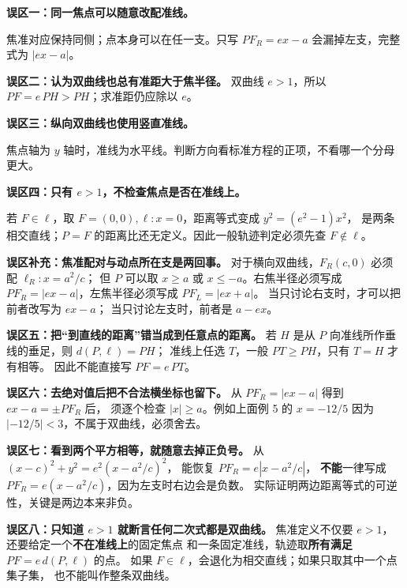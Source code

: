 \begin{trapbox}
\textbf{误区一：同一焦点可以随意改配准线。}

焦准对应保持同侧；点本身可以在任一支。只写 $PF_R=ex-a$ 会漏掉左支，完整式为 $|ex-a|$。

\textbf{误区二：认为双曲线也总有准距大于焦半径。}
双曲线 $e>1$，所以 $PF=e\,PH>PH$；求准距仍应除以 $e$。
\end{trapbox}
\clearpage
\begin{trapbox}
\textbf{误区三：纵向双曲线也使用竖直准线。}

焦点轴为 $y$ 轴时，准线为水平线。判断方向看标准方程的正项，不看哪一个分母更大。
\end{trapbox}
\clearpage
\begin{trapbox}
\textbf{误区四：只有 $e>1$，不检查焦点是否在准线上。}

若 $F\in\ell$，取 $F=(0,0),\ell:x=0$，距离等式变成 $y^2=(e^2-1)x^2$，
是两条相交直线；$P=F$ 的距离比还无定义。因此一般轨迹判定必须先查 $F\notin\ell$。
\end{trapbox}
\clearpage
\begin{trapbox}

\medskip
\textbf{误区补充：焦准配对与动点所在支是两回事。}
对于横向双曲线，$F_R(c,0)$ 必须配 $\ell_R:x=a^2/c$；
但 $P$ 可以取 $x\ge a$ 或 $x\le-a$。右焦半径必须写成
$PF_R=|ex-a|$，左焦半径必须写成 $PF_L=|ex+a|$。
当只讨论右支时，才可以把前者改写为 $ex-a$；
当只讨论左支时，前者是 $a-ex$。

\end{trapbox}
\clearpage
\begin{trapbox}

\medskip
\textbf{误区五：把“到直线的距离”错当成到任意点的距离。}
若 $H$ 是从 $P$ 向准线所作垂线的垂足，则 $d(P,\ell)=PH$；
准线上任选 $T$，一般 $PT\ge PH$，只有 $T=H$ 才有相等。
因此不能直接写 $PF=e\,PT$。

\textbf{误区六：去绝对值后把不合法横坐标也留下。}
从 $PF_R=|ex-a|$ 得到 $ex-a=\pm PF_R$ 后，
须逐个检查 $|x|\ge a$。例如上面例 5 的 $x=-12/5$
因为 $|-12/5|<3$，不属于双曲线，必须舍去。

\textbf{误区七：看到两个平方相等，就随意去掉正负号。}
从 $(x-c)^2+y^2=e^2(x-a^2/c)^2$，
能恢复 $PF_R=e|x-a^2/c|$，
\textbf{不能}一律写成 $PF_R=e(x-a^2/c)$，因为左支时右边会是负数。
实际证明两边距离等式的可逆性，关键是两边本来非负。

\textbf{误区八：只知道 $e>1$ 就断言任何二次式都是双曲线。}
焦准定义不仅要 $e>1$，还要给定一个\textbf{不在准线上}的固定焦点
和一条固定准线，轨迹取\textbf{所有满足} $PF=e\,d(P,\ell)$ 的点。
如果 $F\in\ell$，会退化为相交直线；如果只取其中一个点集子集，
也不能叫作整条双曲线。

\end{trapbox}
